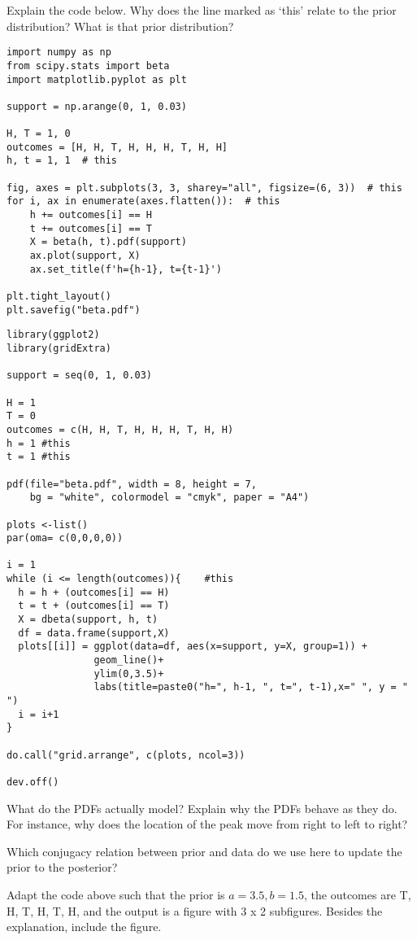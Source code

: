 \begin{exercise}
Explain the code below. Why does the line marked as `this' relate to the  prior distribution? What is that prior distribution?
\begin{verbatim}
import numpy as np
from scipy.stats import beta
import matplotlib.pyplot as plt

support = np.arange(0, 1, 0.03)

H, T = 1, 0
outcomes = [H, H, T, H, H, H, T, H, H]
h, t = 1, 1  # this

fig, axes = plt.subplots(3, 3, sharey="all", figsize=(6, 3))  # this
for i, ax in enumerate(axes.flatten()):  # this
    h += outcomes[i] == H
    t += outcomes[i] == T
    X = beta(h, t).pdf(support)
    ax.plot(support, X)
    ax.set_title(f'h={h-1}, t={t-1}')

plt.tight_layout()
plt.savefig("beta.pdf")
\end{verbatim}

\begin{verbatim}
library(ggplot2)
library(gridExtra)

support = seq(0, 1, 0.03)

H = 1
T = 0
outcomes = c(H, H, T, H, H, H, T, H, H)
h = 1 #this
t = 1 #this

pdf(file="beta.pdf", width = 8, height = 7,
    bg = "white", colormodel = "cmyk", paper = "A4")

plots <-list()
par(oma= c(0,0,0,0))

i = 1
while (i <= length(outcomes)){    #this
  h = h + (outcomes[i] == H)
  t = t + (outcomes[i] == T)
  X = dbeta(support, h, t)
  df = data.frame(support,X)
  plots[[i]] = ggplot(data=df, aes(x=support, y=X, group=1)) +
               geom_line()+
               ylim(0,3.5)+
               labs(title=paste0("h=", h-1, ", t=", t-1),x=" ", y = " ")
  i = i+1
}

do.call("grid.arrange", c(plots, ncol=3))

dev.off()
\end{verbatim}


\end{exercise}

\begin{exercise}
What do the PDFs actually model? Explain why the PDFs behave as they do. For instance, why does the location of the peak move from right to left to right?
\end{exercise}

\begin{exercise}
Which conjugacy relation between prior and data do we use here to update the prior to the posterior?
\end{exercise}

\begin{exercise}
Adapt the  code above such that the prior is $a=3.5, b= 1.5$, the outcomes are T, H, T, H, T, H, and the output is a figure with 3 x 2 subfigures. Besides the explanation, include the figure.
\end{exercise}




